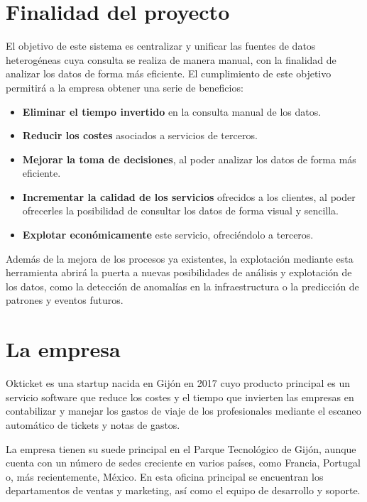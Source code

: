 \section{Finalidad del proyecto}\label{sec:finalidad}
El objetivo de este sistema es centralizar y unificar las fuentes de datos heterogéneas
cuya consulta se realiza de manera manual, con la finalidad de analizar los datos de forma
más eficiente. El cumplimiento de este objetivo permitirá a la empresa obtener una serie de
beneficios:
\begin{itemize}[noitemsep]
	\item \textbf{Eliminar el tiempo invertido} en la consulta manual de los datos.
	\item \textbf{Reducir los costes} asociados a servicios de terceros.
	\item \textbf{Mejorar la toma de decisiones}, al poder analizar los datos de forma más eficiente.
	\item \textbf{Incrementar la calidad de los servicios} ofrecidos a los clientes, al poder ofrecerles
	      la posibilidad de consultar los datos de forma visual y sencilla.
	\item \textbf{Explotar económicamente} este servicio, ofreciéndolo a terceros.
\end{itemize}

Además de la mejora de los procesos ya existentes, la explotación mediante esta herramienta
abrirá la puerta a nuevas posibilidades de análisis y explotación de los datos, como la detección
de anomalías en la infraestructura o la predicción de patrones y eventos futuros.

\section{La empresa}\label{sec:empresa}
Okticket es una startup nacida en Gijón en 2017 cuyo producto principal es un servicio software
que reduce los costes y el tiempo que invierten las empresas en contabilizar y manejar los gastos
de viaje de los profesionales mediante el escaneo automático de tickets y notas de gastos.

La empresa tienen su suede principal  en el Parque Tecnológico de Gijón, aunque cuenta con un número
de sedes creciente en varios países, como Francia, Portugal o, más recientemente, México. En esta
oficina principal se encuentran los departamentos de ventas y marketing, así como el equipo de
desarrollo y soporte.

